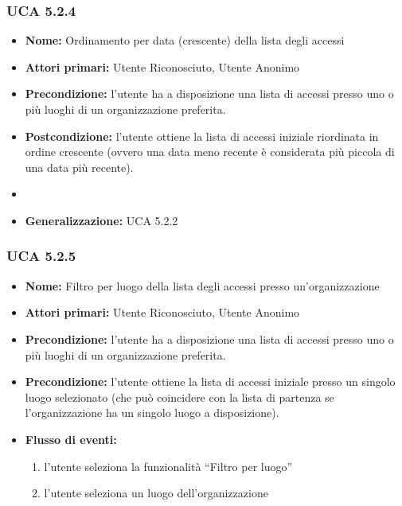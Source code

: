 \subsubsection{UCA 5.2.4}
\begin{itemize}
    \item \textbf{Nome:} Ordinamento per data (crescente) della lista degli accessi
    \item \textbf{Attori primari:} Utente Riconosciuto, Utente Anonimo
    \item \textbf{Precondizione:} l’utente ha a disposizione una lista di accessi presso uno o più luoghi di un organizzazione preferita.
    \item \textbf{Postcondizione:} l’utente ottiene la lista di accessi iniziale riordinata in ordine crescente (ovvero una data meno recente è considerata più piccola di una data più recente).
    \item \item \textbf{Generalizzazione:} UCA 5.2.2
\end{itemize}

\subsubsection{UCA 5.2.5}
\begin{itemize}
    \item \textbf{Nome:} Filtro per luogo della lista degli accessi presso un’organizzazione
    \item \textbf{Attori primari:} Utente Riconosciuto, Utente Anonimo
    \item \textbf{Precondizione:} l’utente ha a disposizione una lista di accessi presso uno o più luoghi di un organizzazione preferita.
    \item \textbf{Precondizione:} l’utente ottiene la lista di accessi iniziale presso un singolo luogo selezionato (che può coincidere con la lista di partenza se l’organizzazione ha un singolo luogo a disposizione).
    \item \textbf{Flusso di eventi:}
    \begin{enumerate}
        \item l’utente seleziona la funzionalità “Filtro per luogo”
        \item l’utente seleziona un luogo dell’organizzazione
    \end{enumerate}
\end{itemize}
